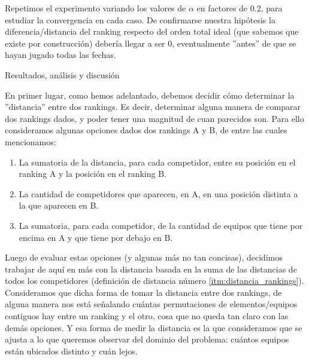 \begin{LaTeXdescription}
        \par Repetimos el experimento variando los valores de $\alpha$ en
        factores de $0.2$, para estudiar la convergencia en cada caso.  De
        confirmarse nuestra hip\'otesis la diferencia/distancia del ranking
        respecto del orden total ideal (que sabemos que existe por
        construcci\'on) deber\'ia llegar a ser 0, eventualmente ''antes'' de que
        se hayan jugado todas las fechas.\\

    \item[Resultados, an\'alisis y discusi\'on]
\end{LaTeXdescription}

\par En primer lugar, como hemos adelantado, debemos decidir cómo determinar la
''distancia'' entre dos rankings. Es decir, determinar alguna manera de comparar
dos rankings dados, y poder tener una magnitud de cuan parecidos son. Para ello
consideramos algunas opciones dados dos rankings A y B, de entre las cuales
mencionamos:

\begin{enumerate}
        \item La sumatoria de la distancia, para cada competidor, entre su
            posici\'on en el ranking A y la posici\'on en el ranking
            B.\label{itm:distancia_rankings}
        \item La cantidad de competidores que aparecen, en A, en una posición distinta a la que aparecen en B.
        \item La sumatoria, para cada competidor, de la cantidad de equipos que tiene por encima en A y que tiene por debajo en B.
\end{enumerate}

\par Luego de evaluar estas opciones (y algunas m\'as no tan concisas),
decidimos trabajar de aqu\'i en m\'as con la distancia basada en la suma de las
distancias de todos los competidores (definici\'on de distancia n\'umero
\ref{itm:distancia_rankings}). Consideramos que dicha forma de tomar la
distancia entre dos rankings, de alguna manera nos est\'a se\~nalando cuántas
permutaciones de elementos/equipos contiguos hay entre un ranking y el otro,
cosa que no queda tan claro con las dem\'as opciones. Y esa forma de medir la
distancia es la que consideramos que se ajusta a lo que queremos observar del
dominio del problema: cu\'antos equipos est\'an ubicados distinto y cuán lejos.

